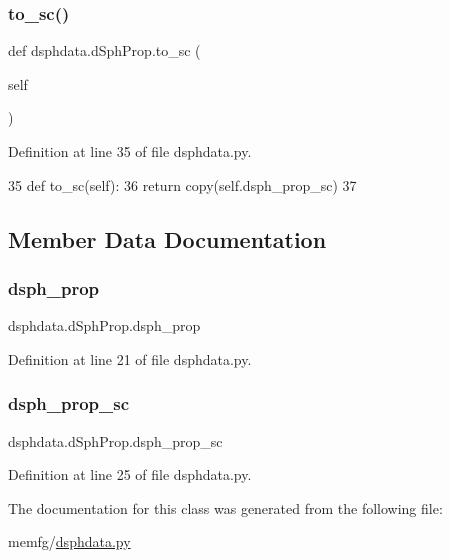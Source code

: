\subsubsection{\texorpdfstring{to\+\_\+sc()}{to\_sc()}}
{\footnotesize\ttfamily def dsphdata.\+d\+Sph\+Prop.\+to\+\_\+sc (\begin{DoxyParamCaption}\item[{}]{self }\end{DoxyParamCaption})}



Definition at line 35 of file dsphdata.\+py.


\begin{DoxyCode}
35     \textcolor{keyword}{def }to\_sc(self):
36         \textcolor{keywordflow}{return} copy(self.dsph\_prop\_sc)
37 
\end{DoxyCode}


\subsection{Member Data Documentation}
\mbox{\label{classdsphdata_1_1dSphProp_aabd823cddc1788bdec1832e66b561fed}} 
\subsubsection{\texorpdfstring{dsph\+\_\+prop}{dsph\_prop}}
{\footnotesize\ttfamily dsphdata.\+d\+Sph\+Prop.\+dsph\+\_\+prop}



Definition at line 21 of file dsphdata.\+py.

\mbox{\label{classdsphdata_1_1dSphProp_aeccdbe40f92c40609af736edef043363}} 
\subsubsection{\texorpdfstring{dsph\+\_\+prop\+\_\+sc}{dsph\_prop\_sc}}
{\footnotesize\ttfamily dsphdata.\+d\+Sph\+Prop.\+dsph\+\_\+prop\+\_\+sc}



Definition at line 25 of file dsphdata.\+py.



The documentation for this class was generated from the following file\+:\begin{DoxyCompactItemize}
\item 
memfg/\hyperlink{dsphdata_8py}{dsphdata.\+py}\end{DoxyCompactItemize}
